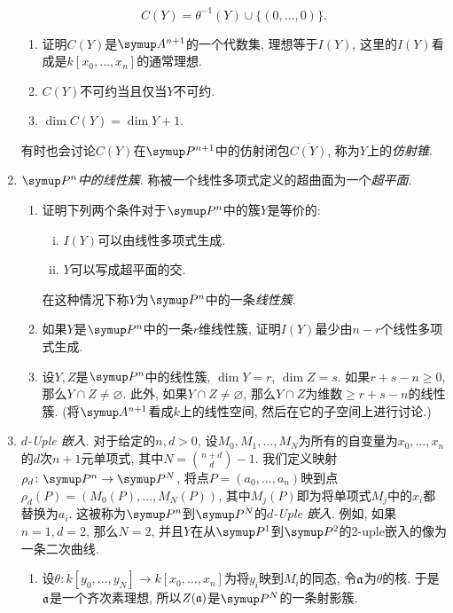 \begin{enumerate}
        \begin{equation*}
            C(Y)=\theta^{-1}(Y)\cup\{(0, \dotsc, 0)\}.
        \end{equation*}
        \begin{enumerate}
            \item 证明$C(Y)$是$\AA{n+1}$的一个代数集, 理想等于$I(Y)$, 这里的$I(Y)$看成是$k[x_0, \dotsc, x_n]$的通常理想.
            \item $C(Y)$不可约当且仅当$Y$不可约.
            \item $\dim C(Y) = \dim Y + 1$.
        \end{enumerate}
        有时也会讨论$C(Y)$在$\PP{n+1}$中的仿射闭包$\overline{C(Y)}$, 称为$Y$上的\emph{仿射锥}.
    \item \emph{$\Pn$中的线性簇}. 称被一个线性多项式定义的超曲面为一个\emph{超平面}.
        \begin{enumerate}
            \item 证明下列两个条件对于$\Pn$中的簇$Y$是等价的:
                \begin{enumerate}[(i)]
                    \item $I(Y)$可以由线性多项式生成.
                    \item $Y$可以写成超平面的交.
                \end{enumerate}
                在这种情况下称$Y$为$\Pn$中的一条\emph{线性簇}.
            \item 如果$Y$是$\Pn$中的一条$r$维线性簇, 证明$I(Y)$最少由$n-r$个线性多项式生成.
            \item 设$Y, Z$是$\Pn$中的线性簇, $\dim Y = r$, $\dim Z = s$. 如果$r+s-n\geq 0$, 那么$Y\cap Z\neq \varnothing$. 此外, 如果$Y\cap Z\neq \varnothing$, 那么$Y\cap Z$为维数$\geq r+s-n$的线性簇. (将$\AA{n+1}$看成$k$上的线性空间, 然后在它的子空间上进行讨论.)
        \end{enumerate}
    \item \emph{$d$-{\upshape Uple} 嵌入}. 对于给定的$n, d>0$, 设$M_0, M_1, \dotsc, M_N$为所有的自变量为$x_0, \dotsc, x_n$的$d$次$n+1$元单项式, 其中$N = \binom{n+d}{d} - 1$. 我们定义映射$\rho_d\colon \Pn\to\PP{N}$, 将点$P = (a_0, \dotsc, a_n)$映到点$\rho_d(P) = (M_0(P), \dotsc, M_N(P))$, 其中$M_j(P)$即为将单项式$M_j$中的$x_i$都替换为$a_i$. 这被称为$\Pn$到$\PP{N}$的\emph{$d$-{\upshape Uple} 嵌入}. 例如, 如果$n=1, d=2$, 那么$N=2$, 并且$Y$在从$\PP{1}$到$\PP{2}$的2-uple嵌入的像为一条二次曲线.
        \begin{enumerate}
            \item 设$\theta\colon k[y_0, \dotsc, y_N]\to k[x_0, \dotsc, x_n]$为将$y_i$映到$M_i$的同态, 令$\mathfrak{a}$为$\theta$的核. 于是$\mathfrak{a}$是一个齐次素理想, 所以$Z(\mathfrak{a})$是$\PP{N}$的一条射影簇.

\end{enumerate}
\end{enumerate}
